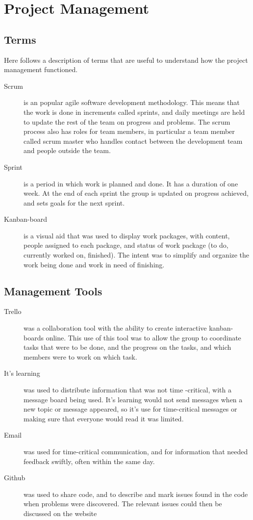 \chapter{Project Management}
\section{Terms}
Here follows a description of terms that are useful to understand how the project management functioned. 

\begin{description}
\item[Scrum] \label{def:scrum}is an popular agile software development methodology. This means that the work is done in increments called sprints, and daily meetings are held to update the rest of the team on progress and problems. The scrum process also has roles for team members, in particular a team member called scrum master who handles contact between the development team and people outside the team.

\item[Sprint] \label{def:sprint} is a period in which work is planned and done. It has a duration of one week. At the end of each sprint the group is updated on progress achieved, and sets goals for the next sprint. 
\item[Kanban-board] \label{def:kanban} is a visual aid that was used to display work packages, with content, people assigned to each package, and status of work package (to do, currently worked on, finished). The intent was to simplify and organize the work being done and work in need of finishing.
\end{description}

\section{Management Tools}
 
\begin{description}

\item[Trello]  \label{def:trello} was a collaboration tool with the ability to create interactive kanban-boards online. This use of this tool was to allow the group to coordinate tasks that were to be done, and the progress on the tasks, and which members were to work on which task. 

\item[It's learning] was used to distribute information that was not time -critical, with a message board being used. It's learning would not send messages when a new topic or message appeared, so it's use for time-critical messages or making sure that everyone would read it was limited. 

\item[Email] was used for time-critical communication, and for information that needed feedback swiftly, often within the same day.

\item[Github] \label{def:github} was used to share code, and to describe and mark issues found in the code when problems were discovered. The relevant issues could then be discussed on the website
\end{description}

